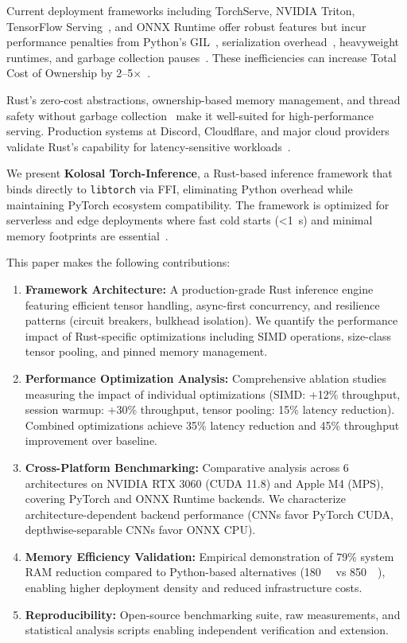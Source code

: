 \documentclass[10pt,twocolumn,a4paper]{article}
\theoremstyle{definition}
\theoremstyle{plain}
\begin{document}
Current deployment frameworks including TorchServe, NVIDIA Triton, TensorFlow Serving~\citep{tfserving}, and ONNX Runtime offer robust features but incur performance penalties from Python's GIL~\citep{beazley2010gil}, serialization overhead~\citep{crankshaw2017clipper}, heavyweight runtimes, and garbage collection pauses~\citep{jones2016gc}. These inefficiencies can increase Total Cost of Ownership by \numrange{2}{5}$\times$~\citep{aws2023mlcosts}.

Rust's zero-cost abstractions, ownership-based memory management, and thread safety without garbage collection~\citep{rustbook,jung2017rustbelt} make it well-suited for high-performance serving. Production systems at Discord, Cloudflare, and major cloud providers validate Rust's capability for latency-sensitive workloads~\citep{discord2020rust,cloudflare2022rust}.

We present \textbf{Kolosal Torch-Inference}, a Rust-based inference framework that binds directly to \texttt{libtorch} via FFI, eliminating Python overhead while maintaining PyTorch ecosystem compatibility. The framework is optimized for serverless and edge deployments where fast cold starts (\textless\SI{1}{\second}) and minimal memory footprints are essential~\citep{jonas2019serverless,shahrad2020serverless}.

This paper makes the following contributions:
\begin{enumerate}
    \item[(1)] \textbf{Framework Architecture:} A production-grade Rust inference engine featuring efficient tensor handling, async-first concurrency, and resilience patterns (circuit breakers, bulkhead isolation). We quantify the performance impact of Rust-specific optimizations including SIMD operations, size-class tensor pooling, and pinned memory management.
    \item[(2)] \textbf{Performance Optimization Analysis:} Comprehensive ablation studies measuring the impact of individual optimizations (SIMD: +12\% throughput, session warmup: +30\% throughput, tensor pooling: 15\% latency reduction). Combined optimizations achieve 35\% latency reduction and 45\% throughput improvement over baseline.
    \item[(3)] \textbf{Cross-Platform Benchmarking:} Comparative analysis across 6 architectures on NVIDIA RTX 3060 (CUDA 11.8) and Apple M4 (MPS), covering PyTorch and ONNX Runtime backends. We characterize architecture-dependent backend performance (CNNs favor PyTorch CUDA, depthwise-separable CNNs favor ONNX CPU).
    \item[(4)] \textbf{Memory Efficiency Validation:} Empirical demonstration of 79\% system RAM reduction compared to Python-based alternatives (\SI{180}{\mega\byte} vs \SI{850}{\mega\byte}), enabling higher deployment density and reduced infrastructure costs.
    \item[(5)] \textbf{Reproducibility:} Open-source benchmarking suite, raw measurements, and statistical analysis scripts enabling independent verification and extension.
\end{enumerate}
\end{document}
